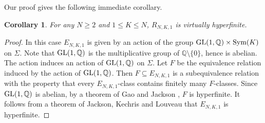 \documentclass{amsart}
\newtheorem{theorem}{Theorem}[section]
\newtheorem{corollary}[theorem]{Corollary}
\theoremstyle{definition}
\theoremstyle{problem}
\theoremstyle{remark}
\numberwithin{equation}{section}
\begin{document}


Our proof gives the following immediate corollary.

\begin{corollary}\label{cor:L1} For any $N\geq 2$ and $1\leq K\leq N$, $R_{N,K,1}$ is virtually hyperfinite.
\end{corollary}

\begin{proof} In this case $E_{N,K,1}$ is given by an action of the group $\mbox{\rm GL}(1,\mathbb{Q})\times \mbox{\rm Sym}(K)$ on $\Sigma$. Note that $\mbox{\rm GL}(1,\mathbb{Q})$ is the multiplicative group of $\mathbb{Q}\setminus\{0\}$, hence is abelian. The action induces an action of $\mbox{\rm GL}(1,\mathbb{Q})$ on $\Sigma$. Let $F$ be the equivalence relation induced by the action of $\mbox{\rm GL}(1, \mathbb{Q})$. Then $F\subseteq E_{N, K, 1}$ is a subequivalence relation with the property that every $E_{N,K,1}$-class contains finitely many $F$-classes.  Since $\mbox{\rm GL}(1,\mathbb{Q})$ is abelian, by a theorem of Gao and Jackson \cite[Corollary 8.2]{GJ}, $F$ is hyperfinite. It follows from a theorem of Jackson, Kechris and Louveau \cite[Proposition 1.3 (vii)]{JKL} that $E_{N,K, 1}$ is hyperfinite.
\end{proof}




\end{document}
